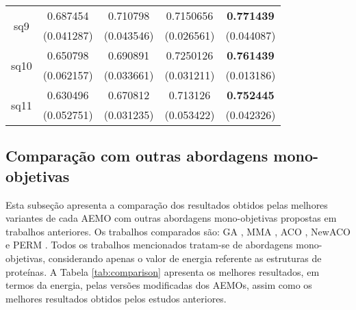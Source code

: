 \begin{table}[]
\begin{tabular}{|c|c|c|c|c|}
		
			\multirow{2}{*}{sq9}      & 0.687454          & 0.710798          & 0.7150656                & \cellcolor[HTML]{C0C0C0}\textbf{0.771439}       \\
			& (0.041287)        & (0.043546)        & (0.026561)               & \cellcolor[HTML]{C0C0C0}(0.044087)              \\ \hline
			  
		  
		  \multirow{2}{*}{sq10}      & 0.650798          & 0.690891         & 0.7250126                & \cellcolor[HTML]{C0C0C0}\textbf{0.761439}       \\
		  & (0.062157)        & (0.033661)        & (0.031211)               & \cellcolor[HTML]{C0C0C0}(0.013186)              \\ \hline
		  
		  
		  
		   
		   \multirow{2}{*}{sq11}      & 0.630496          & 0.670812         & 0.713126                & \cellcolor[HTML]{C0C0C0}\textbf{0.752445}       \\
		   & (0.052751)        & (0.031235)        & (0.053422)               & \cellcolor[HTML]{C0C0C0}(0.042326)              \\ \hline
	\end{tabular}
\end{table}


\subsection{Comparação com outras abordagens mono-objetivas}
Esta subseção apresenta a comparação dos resultados obtidos pelas melhores variantes de cada AEMO com outras abordagens mono-objetivas propostas em trabalhos anteriores. Os trabalhos comparados são: GA \cite{unger1993genetic}, MMA \cite{krasnogor2002multimeme}, ACO \cite{shmygelska2002ant},  NewACO \cite{ shmygelska2003improved} e PERM \cite{hsu2003growth}. Todos os trabalhos mencionados tratam-se de abordagens mono-objetivas, considerando apenas o valor de energia referente as estruturas de proteínas. A Tabela \ref{tab:comparison} apresenta os melhores resultados, em termos da energia, pelas versões modificadas dos AEMOs, assim como os melhores resultados obtidos pelos estudos anteriores.




